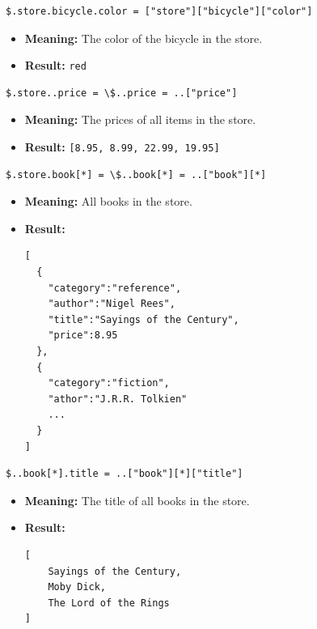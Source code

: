 \documentclass{article}
\newenvironment{codetemplate}[1][]{%
  \mybasecolorbox[#1]
  \itshape
}{%
  \endmybasecolorbox
}
\begin{document}
\begin{codetemplate}{}
\begin{verbatim}
$.store.bicycle.color = ["store"]["bicycle"]["color"]
\end{verbatim}
\end{codetemplate}
\begin{itemize}
    \item \textbf{Meaning:} The color of the bicycle in the store.
    \item \textbf{Result:} \verb|red|
\end{itemize}

\begin{codetemplate}{}
\begin{verbatim}
$.store..price = \$..price = ..["price"]
\end{verbatim}
\end{codetemplate}
\begin{itemize}
    \item \textbf{Meaning:} The prices of all items in the store.
    \item \textbf{Result:} \verb+[8.95, 8.99, 22.99, 19.95]+
\end{itemize}

\begin{codetemplate}{}
\begin{verbatim}
$.store.book[*] = \$..book[*] = ..["book"][*]
\end{verbatim}
\end{codetemplate}
\begin{itemize}
    \item \textbf{Meaning:} All books in the store.
    \item \textbf{Result:}
\begin{verbatim}
[
  {
    "category":"reference",
    "author":"Nigel Rees",
    "title":"Sayings of the Century",
    "price":8.95
  },
  {
    "category":"fiction",
    "athor":"J.R.R. Tolkien"
    ...
  }
]
\end{verbatim}
\end{itemize}

\begin{codetemplate}{}
\begin{verbatim}
$..book[*].title = ..["book"][*]["title"]
\end{verbatim}
\end{codetemplate}
\begin{itemize}
    \item \textbf{Meaning:} The title of all books in the store.
    \item \textbf{Result:}
\begin{verbatim}
[   
    Sayings of the Century, 
    Moby Dick,
    The Lord of the Rings 
]
\end{verbatim}
\end{itemize}
\end{document}
